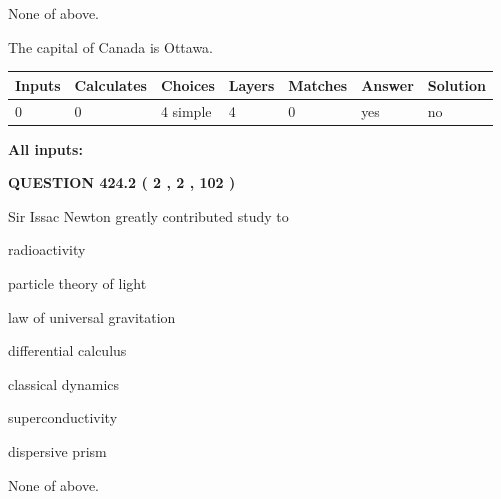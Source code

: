 \documentclass[12pt]{article}
\begin{document}
 
 None of above.
 
 
\noindent{}
 
 
The capital of Canada is Ottawa.
 
 
\noindent{}
 
 
   
   
   
   
\noindent\begin{tabular}{|l|l|l|l|l|l|l|}
 \hline
Inputs & Calculates & Choices & Layers & Matches & Answer & Solution \\ \hline
 0  & 
 0  & 
 4
  simple  
  & 
 4  & 
 0  & 
  yes & 
  no 
  \\ \hline
 \end{tabular}
   
   
   
   
\noindent{}
   
   
   
   
\noindent\vspace{0.1in}\hspace{-0.08in} {\textbf{\Large{All inputs: }}}
   
   
  
\vspace{0.2in}
  
{\textbf{\Large{QUESTION
424.2 
 ( 2 , 2 , 102 )
}}}
  
  
Sir Issac Newton greatly contributed study to
 
 
radioactivity
 
 
particle theory of light
 
 
law of universal gravitation
 
 
differential calculus
 
 
classical dynamics
 
 
superconductivity
 
 
dispersive prism
 
 
 None of above.
 
 
\noindent{}
 
\end{document}
